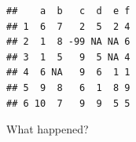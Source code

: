 \documentclass[ignorenonframetext,]{beamer}
\newenvironment{Shaded}{\begin{snugshade}}{\end{snugshade}}
\newcommand{\DecValTok}[1]{\textcolor[rgb]{0.00,0.00,0.81}{#1}}
\newcommand{\StringTok}[1]{\textcolor[rgb]{0.31,0.60,0.02}{#1}}
\newcommand{\OtherTok}[1]{\textcolor[rgb]{0.56,0.35,0.01}{#1}}
\newcommand{\OperatorTok}[1]{\textcolor[rgb]{0.81,0.36,0.00}{\textbf{#1}}}
\newcommand{\NormalTok}[1]{#1}
\begin{document}
\begin{frame}[fragile]

\begin{Shaded}
\end{Shaded}

\begin{verbatim}
##    a  b   c  d  e f
## 1  6  7   2  5  2 4
## 2  1  8 -99 NA NA 6
## 3  1  5   9  5 NA 4
## 4  6 NA   9  6  1 1
## 5  9  8   6  1  8 9
## 6 10  7   9  9  5 5
\end{verbatim}

What happened?

\end{frame}
\end{document}
